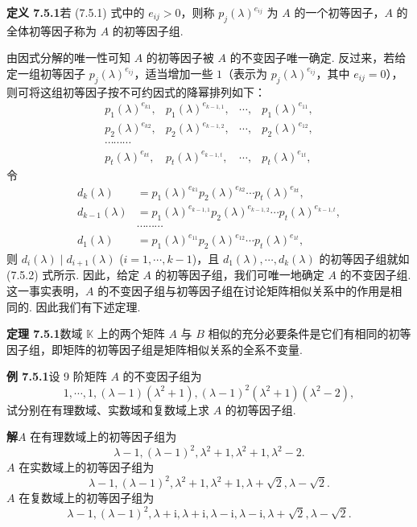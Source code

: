 \documentclass[UTF8, 12pt, fontset=fandol, oneside]{ctexart}
\begin{document}
\noindent\textbf{定义 7.5.1}\quad 若 (7.5.1) 式中的 $e_{ij}>0$，则称 $p_j(\lambda)^{e_{ij}}$ 为 $A$ 的一个初等因子，$A$ 的全体初等因子称为 $A$ 的初等因子组.

由因式分解的唯一性可知 $A$ 的初等因子被 $A$ 的不变因子唯一确定. 反过来，若给定一组初等因子 $p_j(\lambda)^{e_{ij}}$，适当增加一些 $1$（表示为 $p_j(\lambda)^{e_{ij}}$，其中 $e_{ij}=0$），则可将这组初等因子按不可约因式的降幂排列如下：
\begin{equation}
\begin{array}{cccc}
p_1(\lambda)^{e_{k1}}, & p_1(\lambda)^{e_{k-1,1}}, & \cdots, & p_1(\lambda)^{e_{11}},\\
p_2(\lambda)^{e_{k2}}, & p_2(\lambda)^{e_{k-1,2}}, & \cdots, & p_2(\lambda)^{e_{12}},\\
\cdots\cdots\cdots\\
p_t(\lambda)^{e_{kt}}, & p_t(\lambda)^{e_{k-1,t}}, & \cdots, & p_t(\lambda)^{e_{1t}},
\end{array}
\tag{7.5.2}
\end{equation}
令
\[
\begin{aligned}
d_k(\lambda)&=p_1(\lambda)^{e_{k1}}p_2(\lambda)^{e_{k2}}\cdots p_t(\lambda)^{e_{kt}},\\
d_{k-1}(\lambda)&=p_1(\lambda)^{e_{k-1,1}}p_2(\lambda)^{e_{k-1,2}}\cdots p_t(\lambda)^{e_{k-1,t}},\\
&\cdots\cdots\cdots\\
d_1(\lambda)&=p_1(\lambda)^{e_{11}}p_2(\lambda)^{e_{12}}\cdots p_t(\lambda)^{e_{1t}},
\end{aligned}
\]
则 $d_i(\lambda)\mid d_{i+1}(\lambda)$ ($i=1,\cdots,k-1$)，且 $d_1(\lambda),\cdots,d_k(\lambda)$ 的初等因子组就如 (7.5.2) 式所示. 因此，给定 $A$ 的初等因子组，我们可唯一地确定 $A$ 的不变因子组. 这一事实表明，$A$ 的不变因子组与初等因子组在讨论矩阵相似关系中的作用是相同的. 因此我们有下述定理.

\noindent\textbf{定理 7.5.1}\quad 数域 $\mathbb{K}$ 上的两个矩阵 $A$ 与 $B$ 相似的充分必要条件是它们有相同的初等因子组，即矩阵的初等因子组是矩阵相似关系的全系不变量.

\noindent\textbf{例 7.5.1}\quad 设 9 阶矩阵 $A$ 的不变因子组为
\[
1,\cdots,1,(\lambda-1)(\lambda^2+1),(\lambda-1)^2(\lambda^2+1)(\lambda^2-2),
\]
试分别在有理数域、实数域和复数域上求 $A$ 的初等因子组.

\noindent\textbf{解}\quad $A$ 在有理数域上的初等因子组为
\[
\lambda-1,(\lambda-1)^2,\lambda^2+1,\lambda^2+1,\lambda^2-2.
\]
$A$ 在实数域上的初等因子组为
\[
\lambda-1,(\lambda-1)^2,\lambda^2+1,\lambda^2+1,\lambda+\sqrt{2},\lambda-\sqrt{2}.
\]
$A$ 在复数域上的初等因子组为
\[
\lambda-1,(\lambda-1)^2,\lambda+\mathrm{i},\lambda+\mathrm{i},\lambda-\mathrm{i},\lambda-\mathrm{i},\lambda+\sqrt{2},\lambda-\sqrt{2}.
\]
\end{document}
